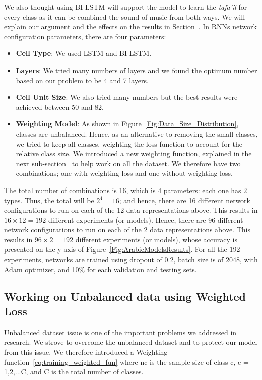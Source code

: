 We also thought using BI-LSTM will support the model to learn the \textit{tafa'il} for every class as it can be combined the sound of music from both ways. We will explain our argument and the effects on the results in Section~.
In RNNs network configuration parameters, there are four parameters:
\begin{itemize}
\item \textbf{Cell Type}: We used LSTM and BI-LSTM.
\item \textbf{Layers}: We tried many numbers of layers and we found the optimum number based on our problem to be 4 and 7 layers.
\item \textbf{Cell Unit Size}: We also tried many numbers but the best results were achieved between 50 and 82.
\item \textbf{Weighting Model}: As shown in Figure~\ref{Fig:Data_Size_Distribution}, classes are unbalanced. Hence, as an alternative to removing the small classes, we tried to keep all classes, weighting the loss function to account for the relative class size. We introduced a new weighting function, explained in the next sub-section~ to help work on all the dataset. We therefore have two combinations; one with weighting loss and one without weighting loss.
 
 \end{itemize}

The total number of combinations is 16, which is $4$ parameters: each one has $2$ types. Thus, the total will be $2^4=16$; and hence, there are 16 different network configurations to run on each of the 12 data representations above. This results in $16 \times 12 = 192$ different experiments (or models). Hence, there are 96 different network configurations to run on each of the 2 data representations above. This results in $96 \times 2 = 192$ different experiments (or models), whose accuracy is presented on the y-axis of Figure~\ref{Fig:ArabicModelsResults}. For all the 192 experiments, networks are trained using dropout of $0.2$, batch size is of $2048$, with Adam optimizer, and 10\% for each validation and testing sets.

\subsection{Working on Unbalanced data using Weighted Loss}\label{Sec:W_Loss}

Unbalanced dataset issue is one of the important problems we addressed in research. We strove to overcome the unbalanced dataset and to protect our model from this issue. We therefore introduced a Weighting function~\ref{eq:training_weighted_fun} where nc is the sample size of class c, c = 1,2,...C, and C is the total number of classes.%


